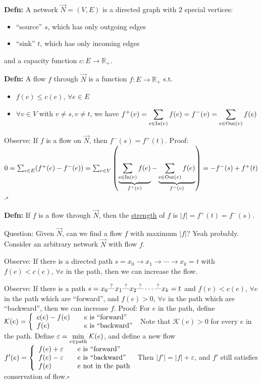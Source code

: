 \documentclass[10pt,letterpaper]{article}
\newcommand{\n}{\hfill\break}
\newcommand{\defn}[1]{\par\noindent\settowidth{\hangindent}{\textbf{Defn: }}\textbf{Defn: }#1\n}
\newcommand{\proven}{\;$\square$\n}
\newcommand{\ptxt}[1]{\textrm{\textnormal{#1}}}
\newcommand{\card}[1]{\left|#1\right|}
\newcommand{\reals}{\mathbb{R}}
\newcommand{\R}{\reals}
\renewcommand{\epsilon}{\varepsilon}
\newcommand{\st}{s.t.}
\begin{document}
\defn{A network $\vec{N}=(V,E)$ is a directed graph with $2$ special vertices:
\begin{itemize}
	\item ``source'' $s$, which has only outgoing edges
	\item ``sink'' $t$, which has only incoming edges
\end{itemize}
and a capacity function $c:E\to\R_{+}$.}

\defn{A flow $f$ through $\vec{N}$ is a function $f:E\to\R_{+}$ \st{}
\begin{itemize}
	\item $f(e)\le{}c(e)$, $\forall{}e\in{}E$
	\item $\forall{}v\in{}V$ with $v\ne{}s,v\ne{}t$, we have $\displaystyle{}f^{+}(v)=\sum_{e\in\ptxt{In}(v)}f(e)=f^{-}(v)=\sum_{e\in\ptxt{Out}(v)}f(e)$
\end{itemize}}

\par\noindent Observe: If $f$ is a flow on $\vec{N}$, then $f^{-}(s)=f^{+}(t)$.\n
Proof: $0=\sum_{e\in{}E}(f^{+}(e)-f^{-}(e))=\sum_{v\in{}V}\left(\underbrace{\sum_{e\in\ptxt{In}(v)}f(e)}_{f^{+}(v)}-\underbrace{\sum_{e\in\ptxt{Out}(v)}f(e)}_{f^{-}(v)}\right)=-f^{-}(s)+f^{+}(t)$.\proven\n

\defn{If $f$ is a flow through $\vec{N}$, then the \underline{strength} of $f$ is $\card{f}=f^{+}(t)=f^{-}(s)$.}

\par\noindent Question: Given $\vec{N}$, can we find a flow $f$ with maximum $\card{f}$? Yeah probably. Consider an arbitrary network $\vec{N}$ with flow $f$.\n

\par\noindent Observe: If there is a directed path $s=x_{0}\to{}x_{1}\to\cdots\to{}x_{k}=t$ with $f(e)<c(e)$, $\forall{}e$ in the path, then we can increase the flow.\n

\par\noindent Observe: If there is a path $s=x_{0}\overset{?}{\ptxt{\----}}x_{1}\overset{?}{\ptxt{\----}}x_{2}\overset{?}{\ptxt{\----}}\cdots\overset{?}{\ptxt{\----}}x_{k}=t$ and $f(e)<c(e)$, $\forall{}e$ in the path which are ``forward'', and $f(e)>0$, $\forall{}e$ in the path which are ``backward'', then we can increase $f$.\n
Proof: For $e$ in the path, define $\mathcal{K}(e)=\left\{\begin{array}{ll}c(e)-f(e) & \quad{}e\ptxt{ is ``forward''}\\ f(e) & \quad{}e\ptxt{ is ``backward''}\end{array}\right.$ Note that $\mathcal{K}(e)>0$ for every $e$ in the path.\n
Define $\epsilon=\underset{e\in\ptxt{path}}{\min}\;\mathcal{K}(e)$, and define a new flow $f'(e)=\left\{\begin{array}{ll}f(e)+\epsilon & \quad{}e\ptxt{ is ``forward''}\\ f(e)-\epsilon & \quad{}e\ptxt{ is ``backward''}\\ f(e) & \quad{}e\ptxt{ not in the path}\end{array}\right.$\n
Then $\card{f'}=\card{f}+\epsilon$, and $f'$ still satisfies conservation of flow.\proven
\end{document}
